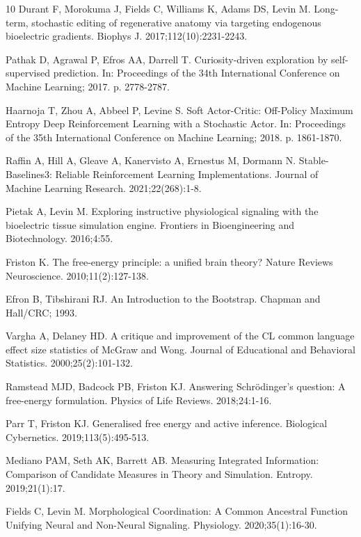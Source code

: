 \documentclass[10pt,letterpaper]{article}
\begin{document}
\begin{thebibliography}{10}
Durant F, Morokuma J, Fields C, Williams K, Adams DS, Levin M. Long-term, stochastic editing of regenerative anatomy via targeting endogenous bioelectric gradients. Biophys J. 2017;112(10):2231-2243.

Pathak D, Agrawal P, Efros AA, Darrell T. Curiosity-driven exploration by self-supervised prediction. In: Proceedings of the 34th International Conference on Machine Learning; 2017. p. 2778-2787.

Haarnoja T, Zhou A, Abbeel P, Levine S. Soft Actor-Critic: Off-Policy Maximum Entropy Deep Reinforcement Learning with a Stochastic Actor. In: Proceedings of the 35th International Conference on Machine Learning; 2018. p. 1861-1870.

Raffin A, Hill A, Gleave A, Kanervisto A, Ernestus M, Dormann N. Stable-Baselines3: Reliable Reinforcement Learning Implementations. Journal of Machine Learning Research. 2021;22(268):1-8.

Pietak A, Levin M. Exploring instructive physiological signaling with the bioelectric tissue simulation engine. Frontiers in Bioengineering and Biotechnology. 2016;4:55.

Friston K. The free-energy principle: a unified brain theory? Nature Reviews Neuroscience. 2010;11(2):127-138.

Efron B, Tibshirani RJ. An Introduction to the Bootstrap. Chapman and Hall/CRC; 1993.

Vargha A, Delaney HD. A critique and improvement of the CL common language effect size statistics of McGraw and Wong. Journal of Educational and Behavioral Statistics. 2000;25(2):101-132.

Ramstead MJD, Badcock PB, Friston KJ. Answering Schrödinger's question: A free-energy formulation. Physics of Life Reviews. 2018;24:1-16.

Parr T, Friston KJ. Generalised free energy and active inference. Biological Cybernetics. 2019;113(5):495-513.

Mediano PAM, Seth AK, Barrett AB. Measuring Integrated Information: Comparison of Candidate Measures in Theory and Simulation. Entropy. 2019;21(1):17.

Fields C, Levin M. Morphological Coordination: A Common Ancestral Function Unifying Neural and Non-Neural Signaling. Physiology. 2020;35(1):16-30.


\end{thebibliography}
\end{document}

